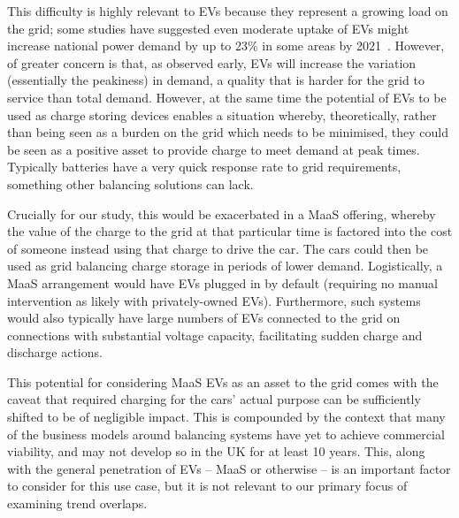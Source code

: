 \documentclass[b5paper,10pt]{article}
\begin{document}
This difficulty is highly relevant to EVs because they represent a
growing load on the grid; some studies have suggested even moderate
uptake of EVs might increase national power demand by up to 23\% in
some areas by 2021~\citep{paffumi-et-al:2015}. However, of greater
concern is that, as observed early, EVs will increase the variation
(essentially the peakiness) in demand, a quality that is harder for
the grid to service than total demand. However, at the same time the
potential of EVs to be used as charge storing devices enables a
situation whereby, theoretically, rather than being seen as a burden
on the grid which needs to be minimised, they could be seen as a
positive asset to provide charge to meet demand at peak
times. Typically batteries have a very quick response rate to grid
requirements, something other balancing solutions can lack.

Crucially for our study, this would be exacerbated in a MaaS offering,
whereby the value of the charge to the grid at that particular time is
factored into the cost of someone instead using that charge to drive
the car. The cars could then be used as grid balancing charge storage
in periods of lower demand. Logistically, a MaaS arrangement would
have EVs plugged in by default (requiring no manual intervention as
likely with privately-owned EVs). Furthermore, such systems would also
typically have large numbers of EVs connected to the grid on
connections with substantial voltage capacity, facilitating sudden
charge and discharge actions.


This potential for considering MaaS EVs as an asset to the grid comes
with the caveat that required charging for the cars' actual purpose
can be sufficiently shifted to be of negligible impact. This is
compounded by the context that many of the business models around
balancing systems have yet to achieve commercial viability, and may
not develop so in the UK for at least 10 years. This, along with the
general penetration of EVs -- MaaS or otherwise -- is an important
factor to consider for this use case, but it is not relevant to our
primary focus of examining trend overlaps.

\end{document}
